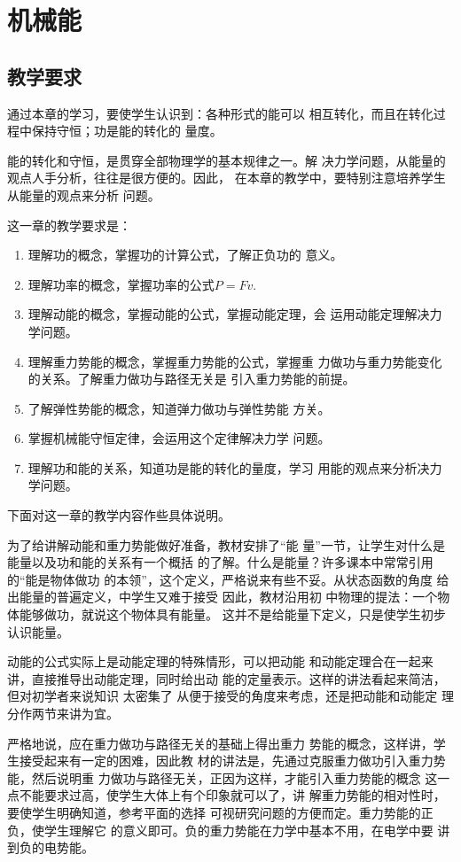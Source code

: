 
\chapter{机械能}\minitoc[n]
\section{教学要求}
通过本章的学习，要使学生认识到：各种形式的能可以
相互转化，而且在转化过程中保持守恒；功是能的转化的
量度。

能的转化和守恒，是贯穿全部物理学的基本规律之一。解
决力学问题，从能量的观点人手分析，往往是很方便的。因此，
在本章的教学中，要特别注意培养学生从能量的观点来分析
问题。

这一章的教学要求是：
\begin{enumerate}
\item 理解功的概念，掌握功的计算公式，了解正负功的
意义。
\item 理解功率的概念，掌握功率的公式$P=Fv$.
\item 理解动能的概念，掌握动能的公式，掌握动能定理，会
运用动能定理解决力学问题。
\item 理解重力势能的概念，掌握重力势能的公式，掌握重
力做功与重力势能变化的关系。了解重力做功与路径无关是
引入重力势能的前提。
\item 了解弹性势能的概念，知道弹力做功与弹性势能
方关。
\item 掌握机械能守恒定律，会运用这个定律解决力学
问题。
\item 理解功和能的关系，知道功是能的转化的量度，学习
用能的观点来分析决力学问题。
\end{enumerate}


下面对这一章的教学内容作些具体说明。

为了给讲解动能和重力势能做好准备，教材安排了“能
量”一节，让学生对什么是能量以及功和能的关系有一个概括
的了解。什么是能量？许多课本中常常引用的“能是物体做功
的本领”，这个定义，严格说来有些不妥。从状态函数的角度
给出能量的普遍定义，中学生又难于接受 因此，教材沿用初
中物理的提法：一个物体能够做功，就说这个物体具有能量。
这并不是给能量下定义，只是使学生初步认识能量。

动能的公式实际上是动能定理的特殊情形，可以把动能
和动能定理合在一起来讲，直接推导出动能定理，同时给出动
能的定量表示。这样的讲法看起来简洁，但对初学者来说知识
太密集了 从便于接受的角度来考虑，还是把动能和动能定
理分作两节来讲为宜。

严格地说，应在重力做功与路径无关的基础上得出重力
势能的概念，这样讲，学生接受起来有一定的困难，因此教
材的讲法是，先通过克服重力做功引入重力势能，然后说明重
力做功与路径无关，正因为这样，才能引入重力势能的概念
这一点不能要求过高，使学生大体上有个印象就可以了，讲
解重力势能的相对性时，要使学生明确知道，参考平面的选择
可视研究问题的方便而定。重力势能的正负，使学生理解它
的意义即可。负的重力势能在力学中基本不用，在电学中要
讲到负的电势能。

